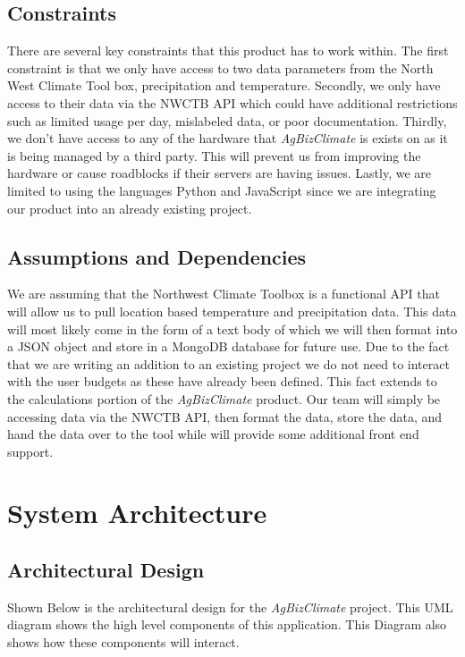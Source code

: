 \documentclass[onecolumn, draftclsnofoot,10pt, compsoc]{article}
\begin{document}
	\subsection{Constraints}
		There are several key constraints that this product has to work within. The first constraint is that we only have access to two data parameters from the North West Climate Tool box, precipitation and temperature. Secondly, we only have access to their data via the NWCTB API which could have additional restrictions such as limited usage per day, mislabeled data, or poor documentation. Thirdly, we don’t have access to any of the hardware that \textit{AgBizClimate} is exists on as it is being managed by a third party. This will prevent us from improving the hardware or cause roadblocks if their servers are having issues. Lastly, we are limited to using the languages Python and JavaScript since we are integrating our product into an already existing project.\\

	\subsection {Assumptions and Dependencies}
		We are assuming that the Northwest Climate Toolbox is a functional API that will allow us to pull location based temperature and precipitation data. This data will most likely come in the form of a text body of which we will then format into a JSON object and store in a MongoDB database for future use. Due to the fact that we are writing an addition to an existing project we do not need to interact with the user budgets as these have already been defined. This fact extends to the calculations portion of the \textit{AgBizClimate} product. Our team will simply be accessing data via the NWCTB API, then format the data, store the data, and hand the data over to the tool while will provide some additional front end support.\\


\section{System Architecture}
	\subsection{Architectural Design}
		Shown Below is the architectural design for the \textit{AgBizClimate} project. This UML diagram shows the high level components of this application. This Diagram also shows how these components will interact.\\
		
\end{document}
